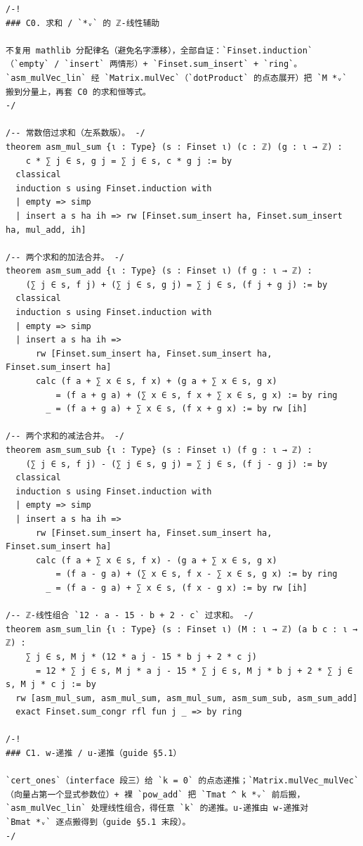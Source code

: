 \documentclass[11pt]{article}
\begin{document}
\begin{lstlisting}
/-!
### C0. 求和 / `*ᵥ` 的 ℤ-线性辅助

不复用 mathlib 分配律名（避免名字漂移），全部自证：`Finset.induction`
（`empty` / `insert` 两情形）+ `Finset.sum_insert` + `ring`。
`asm_mulVec_lin` 经 `Matrix.mulVec`（`dotProduct` 的点态展开）把 `M *ᵥ`
搬到分量上，再套 C0 的求和恒等式。
-/

/-- 常数倍过求和（左系数版）。 -/
theorem asm_mul_sum {ι : Type} (s : Finset ι) (c : ℤ) (g : ι → ℤ) :
    c * ∑ j ∈ s, g j = ∑ j ∈ s, c * g j := by
  classical
  induction s using Finset.induction with
  | empty => simp
  | insert a s ha ih => rw [Finset.sum_insert ha, Finset.sum_insert ha, mul_add, ih]

/-- 两个求和的加法合并。 -/
theorem asm_sum_add {ι : Type} (s : Finset ι) (f g : ι → ℤ) :
    (∑ j ∈ s, f j) + (∑ j ∈ s, g j) = ∑ j ∈ s, (f j + g j) := by
  classical
  induction s using Finset.induction with
  | empty => simp
  | insert a s ha ih =>
      rw [Finset.sum_insert ha, Finset.sum_insert ha, Finset.sum_insert ha]
      calc (f a + ∑ x ∈ s, f x) + (g a + ∑ x ∈ s, g x)
          = (f a + g a) + (∑ x ∈ s, f x + ∑ x ∈ s, g x) := by ring
        _ = (f a + g a) + ∑ x ∈ s, (f x + g x) := by rw [ih]

/-- 两个求和的减法合并。 -/
theorem asm_sum_sub {ι : Type} (s : Finset ι) (f g : ι → ℤ) :
    (∑ j ∈ s, f j) - (∑ j ∈ s, g j) = ∑ j ∈ s, (f j - g j) := by
  classical
  induction s using Finset.induction with
  | empty => simp
  | insert a s ha ih =>
      rw [Finset.sum_insert ha, Finset.sum_insert ha, Finset.sum_insert ha]
      calc (f a + ∑ x ∈ s, f x) - (g a + ∑ x ∈ s, g x)
          = (f a - g a) + (∑ x ∈ s, f x - ∑ x ∈ s, g x) := by ring
        _ = (f a - g a) + ∑ x ∈ s, (f x - g x) := by rw [ih]

/-- ℤ-线性组合 `12 · a - 15 · b + 2 · c` 过求和。 -/
theorem asm_sum_lin {ι : Type} (s : Finset ι) (M : ι → ℤ) (a b c : ι → ℤ) :
    ∑ j ∈ s, M j * (12 * a j - 15 * b j + 2 * c j)
      = 12 * ∑ j ∈ s, M j * a j - 15 * ∑ j ∈ s, M j * b j + 2 * ∑ j ∈ s, M j * c j := by
  rw [asm_mul_sum, asm_mul_sum, asm_mul_sum, asm_sum_sub, asm_sum_add]
  exact Finset.sum_congr rfl fun j _ => by ring

/-!
### C1. w-递推 / u-递推（guide §5.1）

`cert_ones`（interface 段三）给 `k = 0` 的点态递推；`Matrix.mulVec_mulVec`
（向量占第一个显式参数位）+ 裸 `pow_add` 把 `Tmat ^ k *ᵥ` 前后搬，
`asm_mulVec_lin` 处理线性组合，得任意 `k` 的递推。u-递推由 w-递推对
`Bmat *ᵥ` 逐点搬得到（guide §5.1 末段）。
-/


\end{lstlisting}
\end{document}
